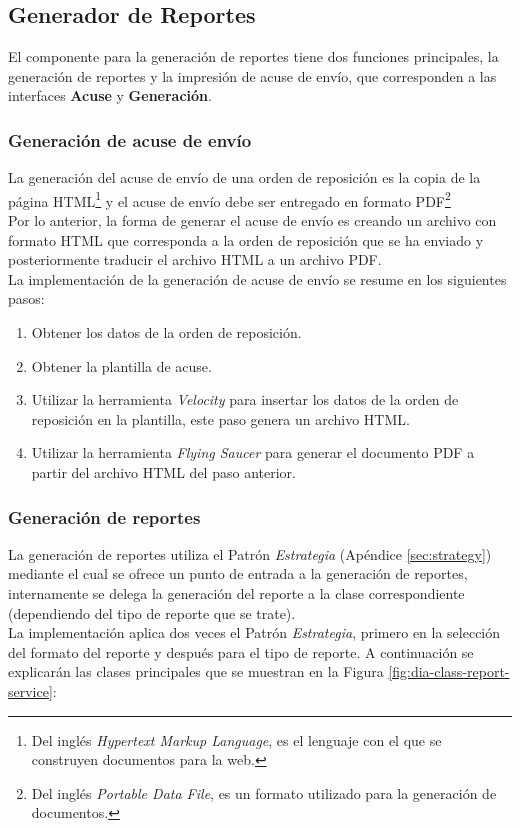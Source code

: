 \subsection{Generador de Reportes}
El componente para la generación de reportes tiene dos funciones principales, la generación de reportes y la impresión de acuse de envío, que corresponden a las interfaces \textbf{Acuse} y \textbf{Generación}.

\subsubsection{Generación de acuse de envío}\label{sec:gen-acuse}
La generación del acuse de envío de una orden de reposición es la copia de la página HTML\footnote{Del inglés \textit{Hypertext Markup Language}, es el lenguaje con el que se construyen documentos para la web\cite{HTMLCSSCompleteReference}.} y el acuse de envío debe ser entregado en formato PDF\footnote{Del inglés \textit{Portable Data File}, es un formato utilizado para la generación de documentos\cite{iTextInAction}.}\\
Por lo anterior, la forma de generar el acuse de envío es creando un archivo con formato HTML que corresponda a la orden de reposición que se ha enviado y posteriormente traducir el archivo HTML a un archivo PDF.\\
La implementación de la generación de acuse de envío se resume en los siguientes pasos:
\begin{enumerate}
	\item Obtener los datos de la orden de reposición.
	\item Obtener la plantilla de acuse.
	\item Utilizar la herramienta \textit{Velocity} para insertar los datos de la orden de reposición en la plantilla, este paso genera un archivo HTML.
	\item Utilizar la herramienta \textit{Flying Saucer} para generar el documento PDF a partir del archivo HTML del paso anterior.
\end{enumerate}

\subsubsection{Generación de reportes}\label{sec:gen-repport}
La generación de reportes utiliza el Patrón \textit{Estrategia} (Apéndice \ref{sec:strategy}) mediante el cual se ofrece un punto de entrada a la generación de reportes, internamente se delega la generación del reporte a la clase correspondiente (dependiendo del tipo de reporte que se trate).\\
La implementación aplica dos veces el Patrón \textit{Estrategia}, primero en la selección del formato del reporte y después para el tipo de reporte. A continuación se explicarán las clases principales que se muestran en la Figura \ref{fig:dia-class-report-service}:

